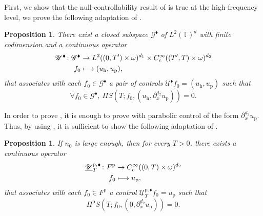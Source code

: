 \documentclass[10pt]{amsart}
\let\mathcal\mathscr
\def\mto{\mathchoice{\longmapsto}{\mapsto}{\mapsto}{\mapsto}}
\newcommand{\sblacklozenge}{{\scriptscriptstyle \blacklozenge}}
\theoremstyle{plain}
\newtheorem{prop}[theorem]{Proposition}
\theoremstyle{definition}
\theoremstyle{remark}
\newcommand{\set}{\mathbb}
\newcommand{\T}{\set{T}}
\newcommand{\h}{{\mathrm h}}
\newcommand{\p}{{\mathrm p}}
\begin{document}
First, we show that the null-controllability result of  is true at the high-frequency level, \ie we prove the following adaptation of .
\begin{prop}
\label{PropControlHighFreqd_x}
There exist a closed subspace $\mathcal{G}^{\sblacklozenge}$ of $L^2(\T)^{d}$ with finite codimension and a continuous operator
\begin{align*}
\mathcal{U}^{\sblacklozenge} \colon
\mathcal{G}^{\sblacklozenge} &\to L^2((0,T')\times\omega)^{d_1} \times C^\infty_c((T',T)\times\omega)^{d_2}\\
f_0 &\mto (u_{\h},u_{\p}),
\end{align*}
that associates with each $f_0 \in \mathcal{G}^{\sblacklozenge} $ a pair of controls $\mathcal{U}^{\sblacklozenge} f_{0}=(u_{\h},u_{\p})$ such that
\begin{equation}
\label{PropKd_x}
\forall f_0 \in \mathcal{G}^{\sblacklozenge},\ \Pi S(T;f_0, (u_{\h},\partial_{x}^{d_2}u_{\p})) = 0.
\end{equation}
\end{prop}
In order to prove , it is enough to prove  with
parabolic control of the form $\partial_{x}^{d_2} u_{\p}$. Thus, by using
, it is sufficient to show the following adaptation of
.
\begin{prop}
\label{LemPar_Bisd_x}
If $n_0$ is large enough, then for every $T>0$, there exists a continuous operator
\begin{align*}
\underline{\mathcal{U}}_T^{\p,\sblacklozenge} \colon
F^\p & \to C^\infty_c((0,T)\times\omega)^{d_2} \\
f_0 &\mto u_{\p},
\end{align*}
that associates with each $f_0 \in F^{\p} $ a control $\underline{\mathcal{U}}_T^{\p,\sblacklozenge} f_{0}=u_{\p}$ such that
\begin{equation*}
\Pi^{\p} S(T; f_0, (0, \partial_{x}^{d_2}u_{\p})) = 0.
\end{equation*}
\end{prop}
\end{document}
